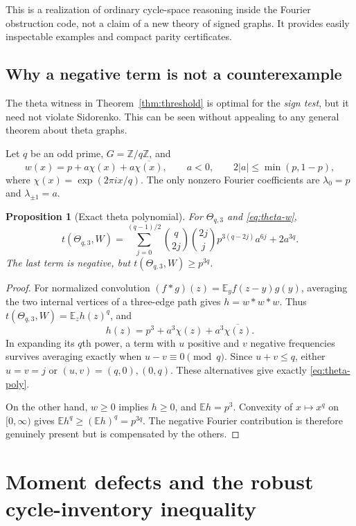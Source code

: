 \documentclass[11pt]{article}
\numberwithin{equation}{section}
\newtheorem{proposition}[theorem]{Proposition}
\theoremstyle{definition}
\theoremstyle{remark}
\newcommand{\E}{\mathbb E}
\newcommand{\Z}{\mathbb Z}
\begin{document}
This is a realization of ordinary cycle-space reasoning inside the
Fourier obstruction code, not a claim of a new theory of signed graphs.
It provides easily inspectable examples and compact parity certificates.

\subsection{Why a negative term is not a counterexample}

The theta witness in Theorem~\ref{thm:threshold} is optimal for the
\emph{sign test}, but it need not violate Sidorenko. This can be seen
without appealing to any general theorem about theta graphs.

Let $q$ be an odd prime, $G=\Z/q\Z$, and
\begin{equation}
 w(x)=p+a\chi(x)+a\overline{\chi(x)},
 \qquad a<0,
 \qquad 2|a|\leq\min(p,1-p),
 \label{eq:theta-w}
\end{equation}
where $\chi(x)=\exp(2\pi ix/q)$. The only nonzero Fourier coefficients
are $\lambda_0=p$ and $\lambda_{\pm1}=a$.

\begin{proposition}[Exact theta polynomial]
\label{prop:theta-polynomial}
For $\Theta_{q,3}$ and \eqref{eq:theta-w},
\begin{equation}
 t(\Theta_{q,3},W)=
 \sum_{j=0}^{(q-1)/2}
   \binom q{2j}\binom{2j}{j}
   p^{3(q-2j)}a^{6j}
   +2a^{3q}.
 \label{eq:theta-poly}
\end{equation}
The last term is negative, but $t(\Theta_{q,3},W)\geq p^{3q}$.
\end{proposition}
\begin{proof}
For normalized convolution
$(f*g)(z)=\E_y f(z-y)g(y)$, averaging the two internal vertices of a
three-edge path gives $h=w*w*w$. Thus
$t(\Theta_{q,3},W)=\E_z h(z)^q$, and
\[
 h(z)=p^3+a^3\chi(z)+a^3\overline{\chi(z)}.
\]
In expanding its $q$th power, a term with $u$ positive and $v$ negative
frequencies survives averaging exactly when $u-v\equiv0\pmod q$.
Since $u+v\leq q$, either $u=v=j$ or $(u,v)=(q,0),(0,q)$.
These alternatives give exactly \eqref{eq:theta-poly}.

On the other hand, $w\geq0$ implies $h\geq0$, and $\E h=p^3$.
Convexity of $x\mapsto x^q$ on $[0,\infty)$ gives
$\E h^q\geq(\E h)^q=p^{3q}$. The negative Fourier contribution is
therefore genuinely present but is compensated by the others.
\end{proof}

\section{Moment defects and the robust cycle-inventory inequality}
\label{sec:robust}
\end{document}

